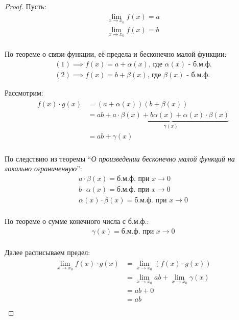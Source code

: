 \begin{proof}
    Пусть:
    \begin{gather*}
        \lim_{x \to x_0} f(x) = a \tag{1} \\
        \lim_{x \to x_0} f(x) = b \tag{2} \\
    \end{gather*}

    По теореме о связи функции, её предела и бесконечно малой функции:
    \begin{gather*}
        (1) \implies f(x) = a + \alpha(x) \text{, где } \alpha(x) \text{ - б.м.ф.} \\
        (2) \implies f(x) = b + \beta(x) \text{, где } \beta(x) \text{ - б.м.ф.}
    \end{gather*}

    Рассмотрим:
    \begin{gather*}
        \begin{align*}
        f(x) \cdot g(x) &= (a + \alpha(x))(b + \beta(x)) \\
                        &= ab + \underbrace{a \cdot \beta(x) + b \alpha (x) + \alpha(x) \cdot \beta(x)}_{\gamma(x)} \\
                        &= ab + \gamma(x) \\
        \end{align*}
    \end{gather*}

    По следствию из теоремы ``\textit{О произведении бесконечно малой функций на локально ограниченную}'':
    \begin{gather*}
        a \cdot \beta(x) = \text{б.м.ф. при } x \to 0 \\ 
        b \cdot \alpha(x) = \text{б.м.ф. при } x \to 0 \\ 
        \alpha(x) \cdot \beta(x) = \text{б.м.ф. при } x \to 0 \\ 
    \end{gather*}

    По теореме о сумме конечного числа с б.м.ф.:
    \begin{gather*}
        \gamma(x) = \text{б.м.ф. при } x \to 0 \\ 
    \end{gather*}

    Далее расписываем предел:
    \begin{gather*}
        \begin{align*}
            \lim_{x \to x_0} f(x) \cdot g(x) &= \lim_{x \to x_0} (f(x) \cdot g(x)) \\
                &= \lim_{x \to x_0} ab + \lim_{x \to x_0} \gamma(x) \\
                &= ab + 0 \\
                &= ab \\
        \end{align*}
    \end{gather*}
\end{proof}



